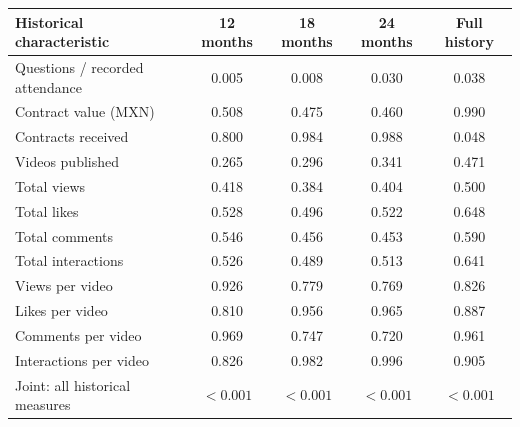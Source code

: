 \begingroup\small
\setlength{\tabcolsep}{3pt}
\renewcommand{\arraystretch}{1.25}
\noindent%
\begin{tabular*}{\linewidth}{@{\extracolsep{\fill}}lcccc@{}}
\toprule
Historical characteristic & 12 months & 18 months & 24 months & Full history \\
\midrule
Questions / recorded attendance & 0.005 & 0.008 & 0.030 & 0.038 \\
\addlinespace
Contract value (MXN) & 0.508 & 0.475 & 0.460 & 0.990 \\
Contracts received & 0.800 & 0.984 & 0.988 & 0.048 \\
\addlinespace
Videos published & 0.265 & 0.296 & 0.341 & 0.471 \\
Total views & 0.418 & 0.384 & 0.404 & 0.500 \\
Total likes & 0.528 & 0.496 & 0.522 & 0.648 \\
Total comments & 0.546 & 0.456 & 0.453 & 0.590 \\
Total interactions & 0.526 & 0.489 & 0.513 & 0.641 \\
Views per video & 0.926 & 0.779 & 0.769 & 0.826 \\
Likes per video & 0.810 & 0.956 & 0.965 & 0.887 \\
Comments per video & 0.969 & 0.747 & 0.720 & 0.961 \\
Interactions per video & 0.826 & 0.982 & 0.996 & 0.905 \\
\midrule
Joint: all historical measures & $<0.001$ & $<0.001$ & $<0.001$ & $<0.001$ \\
\bottomrule
\end{tabular*}\par\endgroup
